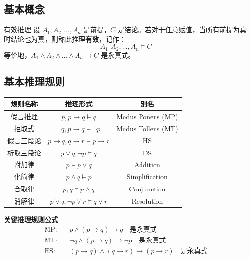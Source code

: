 \subsection{基本概念}

\begin{mydefinition}{有效推理}
设 $A_1, A_2, \dots, A_n$ 是前提，$C$ 是结论。若对于任意赋值，当所有前提为真时结论也为真，则称此推理\textbf{有效}，记作：
\[A_1, A_2, \dots, A_n \models C\]
等价地，$A_1 \land A_2 \land \dots \land A_n \rightarrow C$ 是永真式。
\end{mydefinition}

\subsection{基本推理规则}

\begin{center}
\begin{tabular}{c|c|c}
\toprule
规则名称 & 推理形式 & 别名 \\
\midrule
假言推理 & $p, p \rightarrow q \models q$ & Modus Ponens (MP) \\
拒取式 & $\neg q, p \rightarrow q \models \neg p$ & Modus Tollens (MT) \\
假言三段论 & $p \rightarrow q, q \rightarrow r \models p \rightarrow r$ & HS \\
析取三段论 & $p \lor q, \neg p \models q$ & DS \\
附加律 & $p \models p \lor q$ & Addition \\
化简律 & $p \land q \models p$ & Simplification \\
合取律 & $p, q \models p \land q$ & Conjunction \\
消解律 & $p \lor q, \neg p \lor r \models q \lor r$ & Resolution \\
\bottomrule
\end{tabular}
\end{center}

\begin{myformula}
\textbf{关键推理规则公式}
\[
\begin{aligned}
\text{MP:}&\quad p \land (p \rightarrow q) \rightarrow q \quad \text{是永真式} \\
\text{MT:}&\quad \neg q \land (p \rightarrow q) \rightarrow \neg p \quad \text{是永真式} \\
\text{HS:}&\quad (p \rightarrow q) \land (q \rightarrow r) \rightarrow (p \rightarrow r) \quad \text{是永真式}
\end{aligned}
\]
\end{myformula}

